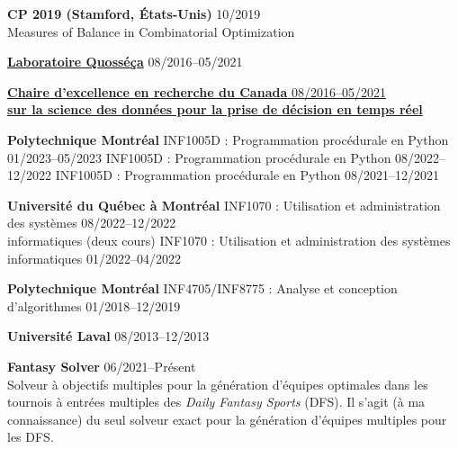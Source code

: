 \documentclass{memoir}
\begin{document}
\begin{list}{}


  \Item \textbf{CP 2019 (Stamford, États-Unis)} \hfill 10/2019 \\
  Measures of Balance in Combinatorial Optimization



  \Item \href{https://www.polymtl.ca/labo-quosseca/en/members/alumni/doctoral-students}{\textbf{Laboratoire Quosséça}} \hfill 08/2016--05/2021

  \Item \href{http://cerc-datascience.polymtl.ca/person/philippe-olivier}{\textbf{Chaire d'excellence en recherche du Canada} \hfill 08/2016--05/2021 \\ \textbf{sur la science des données pour la prise de décision en temps réel}}
  



  \Item \textbf{Polytechnique Montréal}
  \BulletItem INF1005D : Programmation procédurale en Python \hfill 01/2023--05/2023
  \BulletItem INF1005D : Programmation procédurale en Python \hfill 08/2022--12/2022
  \BulletItem INF1005D : Programmation procédurale en Python \hfill 08/2021--12/2021

  \Item \textbf{Université du Québec à Montréal}
  \BulletItem INF1070 : Utilisation et administration des systèmes \hfill 08/2022--12/2022 \\ informatiques (deux cours)
  \BulletItem INF1070 : Utilisation et administration des systèmes informatiques \hfill 01/2022--04/2022



  \Item \textbf{Polytechnique Montréal}
  \BulletItem INF4705/INF8775 : Analyse et conception d'algorithmes \hfill 01/2018--12/2019

  \Item \textbf{Université Laval} \hfill 08/2013--12/2013



  \Item \textbf{Fantasy Solver} \hfill 06/2021--Présent \\
  Solveur à objectifs multiples pour la génération d'équipes optimales dans les tournois à entrées multiples des \emph{Daily Fantasy Sports} (DFS). Il s'agit (à ma connaissance) du seul solveur exact pour la génération d'équipes multiples pour les DFS.
  
\end{list}
\par
\end{document}
